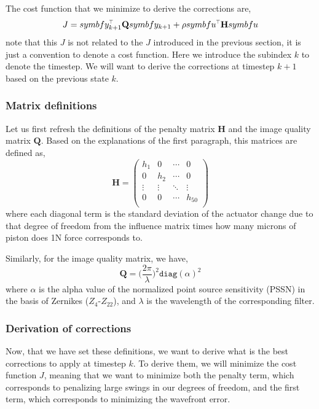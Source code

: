 \documentclass[SE,authoryear,toc]{lsstdoc}
\renewcommand{\v}[1]{\mathbf{#1}}
\newcommand{\tr}{\scalebox{0.6}{$\top$}}
\begin{document}
The cost function that we minimize to derive the corrections are, 
\begin{equation}
    J = \\symbf{y}_{k+1}^{\tr}\v{Q}\\symbf{y}_{k+1} + \rho \\symbf{u}^{\tr}\v{H}\\symbf{u}
\end{equation}
note that this $J$ is not related to the $J$ introduced in the previous section, it is just a convention to denote a cost function. Here we introduce the subindex $k$ to denote the timestep. We will want to derive the corrections at timestep $k+1$ based on the previous state $k$.

\subsubsection*{Matrix definitions}
Let us first refresh the definitions of the penalty matrix $\v{H}$ and the image quality matrix $\v{Q}$. Based on the explanations of the first paragraph, this matrices are defined as, 
\begin{equation}
    \v{H} = \left(
  \begin{array}{cccc}
    h_1 &   0     & \cdots & 0 \\
    0 &   h_2     & \cdots & 0 \\
    \vdots &   \vdots    & \ddots & \vdots \\
    0 &   0     & \cdots & h_{50}  \\
  \end{array}
\right)
\end{equation}
where each diagonal term is the standard deviation of the actuator change due to that degree of freedom from the influence matrix times how many microns of piston does 1N force corresponds to.

Similarly, for the image quality matrix, we have,
\begin{equation}
    \v{Q} = \Big(\frac{2\pi}{\lambda}\Big) ^2 \texttt{diag}(\alpha)^2
\end{equation}
where $\alpha$ is the alpha value of the normalized point source sensitivity (PSSN) in the basis of Zernikes ($Z_4$-$Z_{22}$), and $\lambda$ is the wavelength of the corresponding filter.

\subsubsection*{Derivation of corrections}
Now, that we have set these definitions, we want to derive what is the best corrections to apply at timestep $k$. To derive them, we will minimize the cost function $J$, meaning that we want to minimize both the penalty term, which corresponds to penalizing large swings in our degrees of freedom, and the first term, which corresponds to minimizing the wavefront error.
\end{document}

